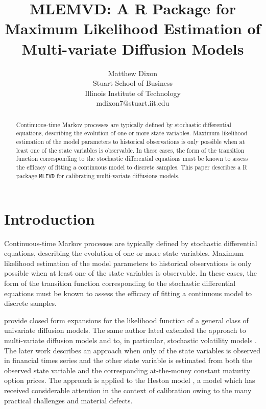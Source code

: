 \documentclass{article}
\begin{document}
\setlength{\pdfpageheight}{\paperheight}
\setlength{\pdfpagewidth}{\paperwidth}


\title{MLEMVD: A R Package for Maximum Likelihood Estimation of Multi-variate Diffusion Models}

\author{Matthew Dixon\\
           Stuart School of Business\\
	   Illinois Institute of Technology\\
           mdixon7@stuart.iit.edu}

\maketitle
\begin{abstract}
Continuous-time Markov
processes are typically defined by stochastic differential equations, describing the evolution of one or more state variables.
Maximum likelihood estimation of the model parameters to historical observations is only possible when at least one of the state variables is observable. In these cases, the form of the transition function corresponding to the stochastic differential equations must be known to assess the efficacy of fitting a continuous model to discrete samples.  This paper describes a R package \verb|MLEVD| for calibrating multi-variate diffusions models.
\end{abstract}


\section{Introduction}
Continuous-time Markov
processes are typically defined by stochastic differential equations, describing the evolution of one or more state variables.
Maximum likelihood estimation of the model parameters to historical observations is only possible when at least one of the state variables is observable. In these cases, the form of the transition function corresponding to the stochastic differential equations must be known to assess the efficacy of fitting a continuous model to discrete samples.  


\cite{Sahalia2002} provide closed form expansions for the likelihood function of a general class of univariate diffusion models. The same author lated extended the approach to multi-variate diffusion models \cite{Sahalia2008} and to, in particular, stochastic volatility models \cite{Sahalia2007}. The later work describes an approach when only of the state variables is observed in financial times series and the other state variable is estimated from both the observed state variable and the corresponding at-the-money constant maturity option prices. The approach is applied to the Heston model \cite{HESTON1993}, a model which has received considerable attention in the context of calibration owing to the many practical challenges and material defects. 
\end{document}
